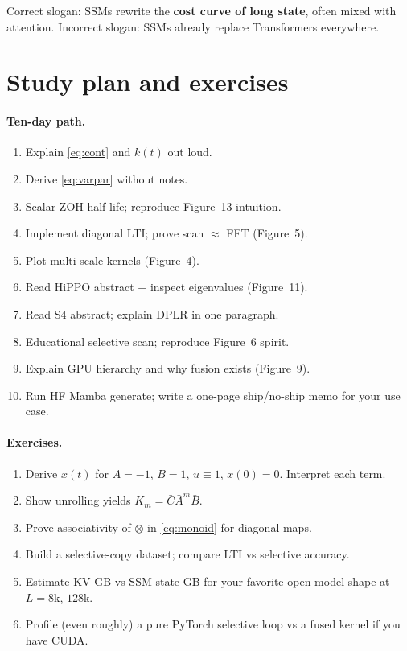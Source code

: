 \documentclass[11pt,a4paper]{article}
\begin{document}
\begin{notebox}
Correct slogan: SSMs rewrite the \textbf{cost curve of long state}, often mixed with attention.
Incorrect slogan: SSMs already replace Transformers everywhere.
\end{notebox}

\section{Study plan and exercises}

\paragraph{Ten-day path.}
\begin{enumerate}[leftmargin=*]
  \item Explain \eqref{eq:cont} and $k(t)$ out loud.
  \item Derive \eqref{eq:varpar} without notes.
  \item Scalar ZOH half-life; reproduce Figure~13 intuition.
  \item Implement diagonal LTI; prove scan $\approx$ FFT (Figure~5).
  \item Plot multi-scale kernels (Figure~4).
  \item Read HiPPO abstract + inspect eigenvalues (Figure~11).
  \item Read S4 abstract; explain DPLR in one paragraph.
  \item Educational selective scan; reproduce Figure~6 spirit.
  \item Explain GPU hierarchy and why fusion exists (Figure~9).
  \item Run HF Mamba generate; write a one-page ship/no-ship memo for your use case.
\end{enumerate}

\paragraph{Exercises.}
\begin{enumerate}[leftmargin=*]
  \item Derive $x(t)$ for $A=-1$, $B=1$, $u\equiv 1$, $x(0)=0$. Interpret each term.
  \item Show unrolling yields $K_m=\bar C\bar A^m\bar B$.
  \item Prove associativity of $\otimes$ in \eqref{eq:monoid} for diagonal maps.
  \item Build a selective-copy dataset; compare LTI vs selective accuracy.
  \item Estimate KV GB vs SSM state GB for your favorite open model shape at $L=8$k, $128$k.
  \item Profile (even roughly) a pure PyTorch selective loop vs a fused kernel if you have CUDA.
\end{enumerate}
\end{document}
